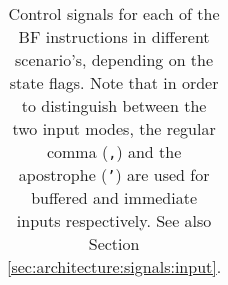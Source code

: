 \begin{landscape}
\begin{longtable}[c] {c|cccc|c|llllll}
    \caption{Control signals for each of the BF instructions in different scenario's, depending on the state flags. Note that in order to distinguish between the two input modes, the regular comma (\texttt{,}) and the apostrophe (\texttt{'}) are used for buffered and immediate inputs respectively. See also Section \ref{sec:architecture:signals:input}.}
    \label{tab:microcode}
  \end{longtable}
\end{landscape}
